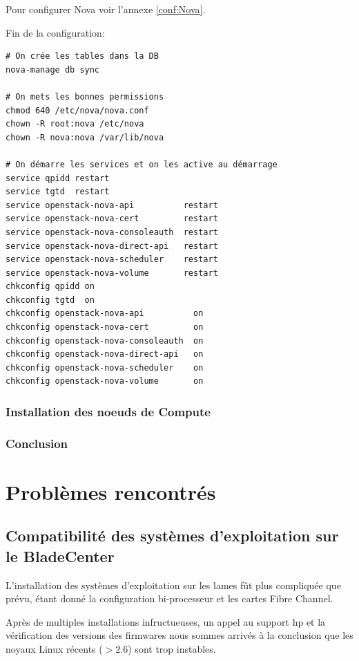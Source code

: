\documentclass[a4paper,oneside]{report}
\begin{document}
\noindent Pour configurer Nova voir l'annexe \ref{conf:Nova}.

\noindent Fin de la configuration:
\begin{verbatim}
# On crée les tables dans la DB
nova-manage db sync

# On mets les bonnes permissions
chmod 640 /etc/nova/nova.conf
chown -R root:nova /etc/nova
chown -R nova:nova /var/lib/nova

# On démarre les services et on les active au démarrage
service qpidd restart
service tgtd  restart
service openstack-nova-api          restart
service openstack-nova-cert         restart
service openstack-nova-consoleauth  restart
service openstack-nova-direct-api   restart
service openstack-nova-scheduler    restart
service openstack-nova-volume       restart
chkconfig qpidd on
chkconfig tgtd  on
chkconfig openstack-nova-api          on
chkconfig openstack-nova-cert         on
chkconfig openstack-nova-consoleauth  on
chkconfig openstack-nova-direct-api   on
chkconfig openstack-nova-scheduler    on
chkconfig openstack-nova-volume       on
\end{verbatim}

\subsection{Installation des noeuds de Compute}



\subsection{Conclusion}


\chapter{Problèmes rencontrés}
\section{Compatibilité des systèmes d'exploitation sur le BladeCenter}
\label{sec:compatblade}
L'installation des systèmes d'exploitation sur les lames fût plus compliquée que prévu, étant donné la configuration bi-processeur et les cartes Fibre Channel.

Après de multiples installations infructueuses, un appel au support \gls{hp} et la vérification des versions des firmwares nous sommes arrivés à la conclusion que les noyaux Linux récents ($ > 2.6 $) sont trop instables.
\end{document}
